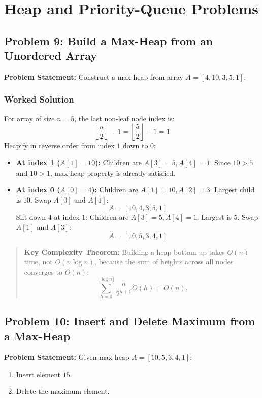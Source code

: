 \section{Heap and Priority-Queue Problems}

\subsection{Problem 9: Build a Max-Heap from an Unordered Array}

\textbf{Problem Statement:} Construct a max-heap from array $A = [4, 10, 3, 5, 1]$.

\subsubsection*{Worked Solution}
For array of size $n = 5$, the last non-leaf node index is:
\[
\left\lfloor \frac{n}{2} \right\rfloor - 1 = \left\lfloor \frac{5}{2} \right\rfloor - 1 = 1
\]
Heapify in reverse order from index $1$ down to $0$:
\begin{itemize}
    \item \textbf{At index 1 ($A[1] = 10$):} Children are $A[3] = 5, A[4] = 1$. Since $10 > 5$ and $10 > 1$, max-heap property is already satisfied.
    \item \textbf{At index 0 ($A[0] = 4$):} Children are $A[1] = 10, A[2] = 3$. Largest child is $10$. Swap $A[0]$ and $A[1]$:
    \[
    A = [10, 4, 3, 5, 1]
    \]
    Sift down $4$ at index $1$: Children are $A[3] = 5, A[4] = 1$. Largest is $5$. Swap $A[1]$ and $A[3]$:
    \[
    \boxed{A = [10, 5, 3, 4, 1]}
    \]
\end{itemize}

\begin{quote}
\textbf{Key Complexity Theorem:} Building a heap bottom-up takes $\boxed{O(n)}$ time, not $O(n \log n)$, because the sum of heights across all nodes converges to $O(n)$:
\[
\sum_{h=0}^{\lfloor \log n \rfloor} \frac{n}{2^{h+1}} O(h) = O(n).
\]
\end{quote}

\subsection{Problem 10: Insert and Delete Maximum from a Max-Heap}

\textbf{Problem Statement:} Given max-heap $A = [10, 5, 3, 4, 1]$:
\begin{enumerate}
    \item Insert element $15$.
    \item Delete the maximum element.
\end{enumerate}

